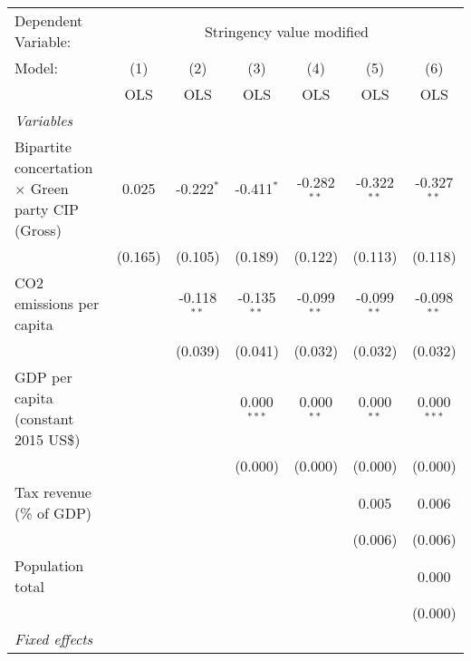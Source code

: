 
\begingroup
\centering
\begin{tabular}{lcccccc}
   \toprule
   Dependent Variable: & \multicolumn{6}{c}{Stringency value modified}\\
   Model:                                                   & (1)     & (2)           & (3)           & (4)           & (5)           & (6)\\  
                                                            &  OLS    & OLS           & OLS           & OLS           & OLS           & OLS\\  
   \midrule
   \emph{Variables}\\
   Bipartite concertation $\times$ Green party CIP (Gross)  & 0.025   & -0.222$^{*}$  & -0.411$^{*}$  & -0.282$^{**}$ & -0.322$^{**}$ & -0.327$^{**}$\\   
                                                            & (0.165) & (0.105)       & (0.189)       & (0.122)       & (0.113)       & (0.118)\\   
   CO2 emissions per capita                                 &         & -0.118$^{**}$ & -0.135$^{**}$ & -0.099$^{**}$ & -0.099$^{**}$ & -0.098$^{**}$\\   
                                                            &         & (0.039)       & (0.041)       & (0.032)       & (0.032)       & (0.032)\\   
   GDP per capita (constant 2015 US\$)                      &         &               & 0.000$^{***}$ & 0.000$^{**}$  & 0.000$^{**}$  & 0.000$^{***}$\\   
                                                            &         &               & (0.000)       & (0.000)       & (0.000)       & (0.000)\\   
   Tax revenue (\% of GDP)                                  &         &               &               &               & 0.005         & 0.006\\   
                                                            &         &               &               &               & (0.006)       & (0.006)\\   
   Population total                                         &         &               &               &               &               & 0.000\\   
                                                            &         &               &               &               &               & (0.000)\\   
   \emph{Fixed effects}\\

\end{tabular}
